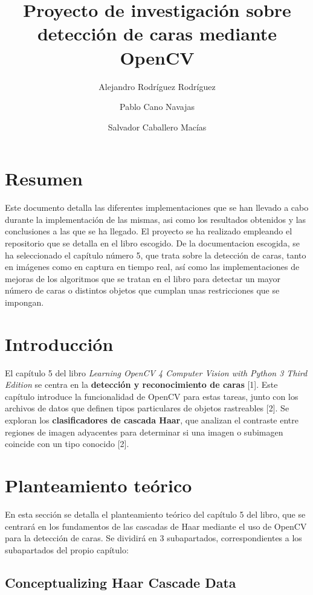 \documentclass[a4paper]{article}
\title{Proyecto de investigación sobre detección de caras mediante OpenCV}
\author{Alejandro Rodríguez Rodríguez \and Pablo Cano Navajas \and Salvador Caballero Macías}
\begin{document}
\maketitle

\newpage
\tableofcontents

\newpage
\section*{Resumen}

Este documento detalla las diferentes implementaciones que se han llevado a cabo durante la implementación de las mismas, asi como los resultados obtenidos y las conclusiones a las que se ha llegado. El proyecto se ha realizado empleando el repositorio\cite{1} que se detalla en el libro escogido\cite{2}.
De la documentacion escogida, se ha seleccionado el capítulo número 5, que trata sobre la detección de caras, tanto en imágenes como en captura en tiempo real, así como las implementaciones de mejoras de los algoritmos que se tratan en el libro para detectar un mayor número de caras o distintos objetos que cumplan unas restricciones que se impongan.

\section{Introducción}

El capítulo 5 del libro \textit{Learning OpenCV 4 Computer Vision with Python 3 Third Edition} \cite{1} se centra en la \textbf{detección y reconocimiento de caras} [1]. Este capítulo introduce la funcionalidad de OpenCV para estas tareas, junto con los archivos de datos que definen tipos particulares de objetos rastreables [2]. Se exploran los \textbf{clasificadores de cascada Haar}, que analizan el contraste entre regiones de imagen adyacentes para determinar si una imagen o subimagen coincide con un tipo conocido [2].

\section{Planteamiento teórico}

En esta sección se detalla el planteamiento teórico del capítulo 5 del libro\cite{1}, que se centrará en los fundamentos de las cascadas de Haar mediante el uso de OpenCV para la detección de caras. Se dividirá en 3 subapartados, correspondientes a los subapartados del propio capítulo:

\subsection{Conceptualizing Haar Cascade Data}
\end{document}
